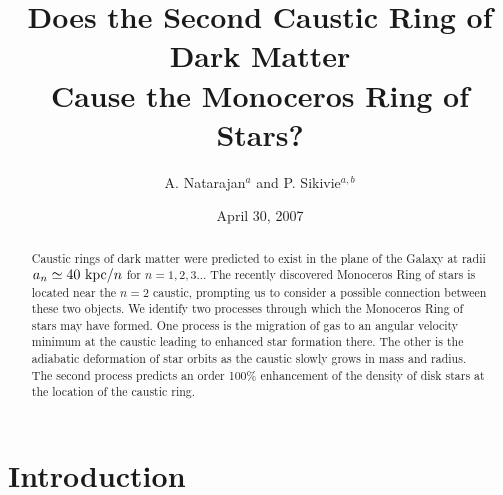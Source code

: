 \documentclass[aps,prd,preprint,tightenlines,floatfix,showpacs,groupedaddress]{revtex4}
\begin{document}
{}
\vspace{2.5in}
\date{April 30, 2007}
\vskip 2cm

\title{Does the Second Caustic Ring of Dark Matter\\ 
Cause the Monoceros Ring of Stars?}

\author{A. Natarajan$^a$ and P. Sikivie$^{a,b}$}



\begin{abstract}

Caustic rings of dark matter were predicted to exist in the 
plane of the Galaxy at radii $a_n \simeq 40~{\rm kpc}/n$ for 
$n = 1,2,3 ..$.  The recently discovered Monoceros Ring of 
stars is located near the $n=2$ caustic, prompting us to 
consider a possible connection between these two objects.  
We identify two processes through which the Monoceros Ring 
of stars may have formed. One process is the migration of 
gas to an angular velocity minimum at the caustic leading 
to enhanced star formation there. The other is the adiabatic 
deformation of star orbits as the caustic slowly grows in 
mass and radius.  The second process predicts an order 100\% 
enhancement of the density of disk stars at the location of 
the caustic ring.

\end{abstract}

\maketitle

\section{Introduction}
\end{document}
